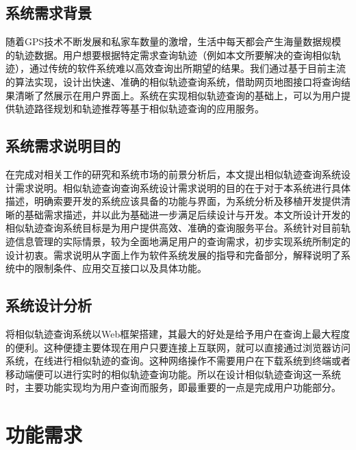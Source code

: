 \subsection{系统需求背景}
\label{subsec:general requirements}
随着GPS技术不断发展和私家车数量的激增，生活中每天都会产生海量数据规模的轨迹数据。用户想要根据特定需求查询轨迹（例如本文所要解决的查询相似轨迹），通过传统的软件系统难以高效查询出所期望的结果。我们通过基于目前主流的算法实现，设计出快速、准确的相似轨迹查询系统，借助网页地图接口将查询结果清晰了然展示在用户界面上。系统在实现相似轨迹查询的基础上，可以为用户提供轨迹路径规划和轨迹推荐等基于相似轨迹查询的应用服务。

\subsection{系统需求说明目的}
\label{subsec:propose}
在完成对相关工作的研究和系统市场的前景分析后，本文提出相似轨迹查询系统设计需求说明。相似轨迹查询查询系统设计需求说明的目的在于对于本系统进行具体描述，明确索要开发的系统应该具备的功能与界面，为系统分析及移植开发提供清晰的基础需求描述，并以此为基础进一步满足后续设计与开发。本文所设计开发的相似轨迹查询系统目标是为用户提供高效、准确的查询服务平台。系统针对目前轨迹信息管理的实际情景，较为全面地满足用户的查询需求，初步实现系统所制定的设计初衷。需求说明从字面上作为软件系统发展的指导和完备部分，解释说明了系统中的限制条件、应用交互接口以及具体功能。

\subsection{系统设计分析}
\label{subsec:system build requirement}
将相似轨迹查询系统以Web框架搭建，其最大的好处是给予用户在查询上最大程度的便利。这种便捷主要体现在用户只要连接上互联网，就可以直接通过浏览器访问系统，在线进行相似轨迹的查询。这种网络操作不需要用户在下载系统到终端或者移动端便可以进行实时的相似轨迹查询功能。所以在设计相似轨迹查询这一系统时，主要功能实现均为用户查询而服务，即最重要的一点是完成用户功能部分。




\section{功能需求}
\label{sec:function requirements}

